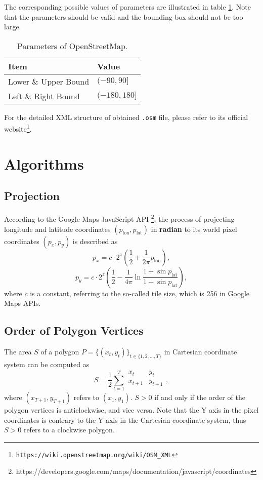 The corresponding possible values of parameters are illustrated in table \ref{tab:osmapi}. Note that the parameters should be valid and the bounding box should not be too large.

\begin{table}[!h]
	\centering
	\caption[Parameters of OpenStreetMap]{Parameters of OpenStreetMap.}
	\label{tab:osmapi}
	\begin{tabular}{l|l}
	\hline
	\textbf{Item} & \textbf{Value} \\
	\hline
	Lower \& Upper Bound & $(-90, 90]$ \\
	Left \& Right Bound & $(-180, 180]$ \\
	\hline
	\end{tabular}
\end{table}

For the detailed XML structure of obtained \lstinline{.osm} file, please refer to  its official website\footnote{\lstinline{https://wiki.openstreetmap.org/wiki/OSM_XML}}.

\chapter{Algorithms}
\section{Projection}\label{app:projec}
According to the Google Maps JavaScript API \footnote{https://developers.google.com/maps/documentation/javascript/coordinates}, the process of projecting longitude and latitude coordinates $(p_{\text{lon}},p_{\text{lat}})$ in \textbf{radian} to its world pixel coordinates $(p_x, p_y)$ is described as
\begin{equation}
p_x = c\cdot2^z(\frac{1}{2}+\frac{1}{2\pi}p_{\text{lon}}),
\end{equation}
\begin{equation}
p_y = c\cdot2^z(\frac{1}{2}-\frac{1}{4\pi}\ln\frac{1+\sin{p_{\text{lat}}}}{1-\sin{p_{\text{lat}}}}),
\end{equation}
where $c$ is a constant, referring to the so-called tile size, which is 256 in Google Maps APIs.

\section{Order of Polygon Vertices}\label{app:revpoly}
The area $S$ of a polygon $P = \{(x_t, y_t)\}_{t \in \{1,2,\ldots,T\}}$ in Cartesian coordinate system can be computed as
\begin{equation}
	S = \frac{1}{2}\sum_{t=1}^{T}\begin{array}{|cc|}
		x_t & y_t \\
		x_{t+1} & y_{t+1} \\
	\end{array},
\end{equation}
where $(x_{T+1}, y_{T+1})$ refers to $(x_1, y_1)$. $S > 0$ if and only if the order of the polygon vertices is anticlockwise, and vice versa. Note that the Y axis in the pixel coordinates is contrary to the Y axis in the Cartesian coordinate system, thus $S > 0$ refers to a clockwise polygon.

